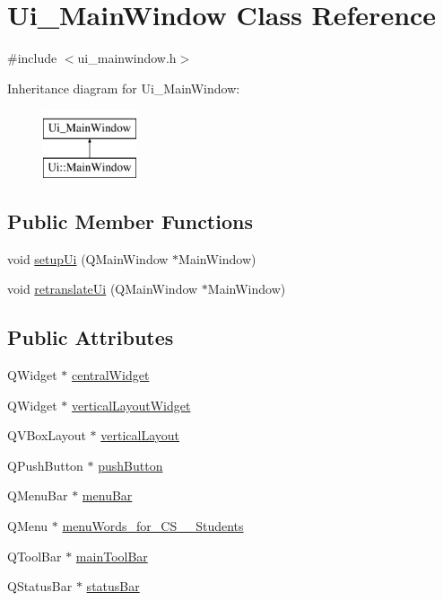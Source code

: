 \hypertarget{class_ui___main_window}{\section{Ui\-\_\-\-Main\-Window Class Reference}
\label{class_ui___main_window}
}


{\ttfamily \#include $<$ui\-\_\-mainwindow.\-h$>$}

Inheritance diagram for Ui\-\_\-\-Main\-Window\-:\begin{figure}[H]
\begin{center}
\leavevmode
\includegraphics[height=2.000000cm]{class_ui___main_window}
\end{center}
\end{figure}
\subsection*{Public Member Functions}
\begin{DoxyCompactItemize}
\item 
void \hyperlink{class_ui___main_window_acf4a0872c4c77d8f43a2ec66ed849b58}{setup\-Ui} (Q\-Main\-Window $\ast$Main\-Window)
\item 
void \hyperlink{class_ui___main_window_a097dd160c3534a204904cb374412c618}{retranslate\-Ui} (Q\-Main\-Window $\ast$Main\-Window)
\end{DoxyCompactItemize}
\subsection*{Public Attributes}
\begin{DoxyCompactItemize}
\item 
Q\-Widget $\ast$ \hyperlink{class_ui___main_window_a30075506c2116c3ed4ff25e07ae75f81}{central\-Widget}
\item 
Q\-Widget $\ast$ \hyperlink{class_ui___main_window_a805d415fff07a22a85219e1f22f2da28}{vertical\-Layout\-Widget}
\item 
Q\-V\-Box\-Layout $\ast$ \hyperlink{class_ui___main_window_aecd96a04789fcfec3f98d80390ad8184}{vertical\-Layout}
\item 
Q\-Push\-Button $\ast$ \hyperlink{class_ui___main_window_ad332d93084584930878f1daf5f84cdbf}{push\-Button}
\item 
Q\-Menu\-Bar $\ast$ \hyperlink{class_ui___main_window_a2be1c24ec9adfca18e1dcc951931457f}{menu\-Bar}
\item 
Q\-Menu $\ast$ \hyperlink{class_ui___main_window_a7f4ea012695a9e61eb752b30df4caa38}{menu\-Words\-\_\-for\-\_\-\-C\-S\-\_\-\_\-\-Students}
\item 
Q\-Tool\-Bar $\ast$ \hyperlink{class_ui___main_window_a5172877001c8c7b4e0f6de50421867d1}{main\-Tool\-Bar}
\item 
Q\-Status\-Bar $\ast$ \hyperlink{class_ui___main_window_a50fa481337604bcc8bf68de18ab16ecd}{status\-Bar}
\end{DoxyCompactItemize}


